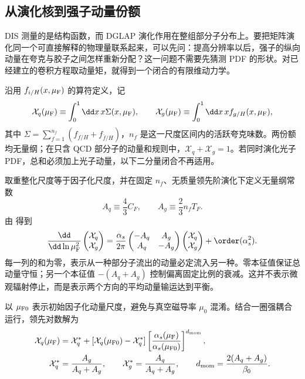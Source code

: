 \subsection{从演化核到强子动量份额}
\label{sec:qcd-momentum-evolution-applications}

DIS 测量的是结构函数，而 DGLAP 演化作用在整组部分子分布上。要把矩阵演化同一个可直接解释的物理量联系起来，可以先问：提高分辨率以后，强子的纵向动量在夸克与胶子之间怎样重新分配？这一问题不需要先猜测 PDF 的形状。对已经建立的卷积方程取动量矩，就得到一个闭合的有限维动力学。

沿用 $f_{i/H}(x,\mu_{\rm F})$ 的算符定义，记
\begin{equation}
 \mathcal X_q(\mu_{\rm F})\equiv\int_0^1\dd x\,x\Sigma(x,\mu_{\rm F}),
 \qquad
 \mathcal X_g(\mu_{\rm F})\equiv\int_0^1\dd x\,x f_{g/H}(x,\mu_{\rm F}),
 \label{eq:qcd-momentum-fractions}
\end{equation}
其中 $\Sigma=\sum_{f=1}^{n_f}(f_{f/H}+f_{\bar f/H})$，$n_f$ 是这一尺度区间内的活跃夸克味数。两份额均无量纲；在只含 QCD 部分子的动量和规则中，$\mathcal X_q+\mathcal X_g=1$。若同时演化光子 PDF，总和必须加上光子动量，以下二分量闭合不再适用。

取重整化尺度等于因子化尺度，并在固定 $n_f$、无质量领先阶演化下定义无量纲常数
\begin{equation*}
 A_q\equiv\frac43C_F,\qquad A_g\equiv\frac23n_fT_F.
\end{equation*}
由 得到
\begin{equation}
 \frac{\dd}{\dd\ln\mu_{\rm F}^2}
 \begin{pmatrix}\mathcal X_q\\\mathcal X_g\end{pmatrix}
 =\frac{\alpha_s}{2\pi}
 \begin{pmatrix}-A_q&A_g\\A_q&-A_g\end{pmatrix}
 \begin{pmatrix}\mathcal X_q\\\mathcal X_g\end{pmatrix}
 +\order(\alpha_s^2).
 \label{eq:qcd-momentum-matrix}
\end{equation}
每一列的和为零，表示从一种部分子流出的动量必定流入另一种。零本征值保证总动量守恒；另一个本征值 $-(A_q+A_g)$ 控制偏离固定比例的衰减。这并不表示微观辐射停止，而是表示两个方向的平均动量输运达到平衡。

以 $\mu_{\rm F0}$ 表示初始因子化动量尺度，避免与真空磁导率 $\mu_0$ 混淆。结合一圈强耦合运行，领先对数解为
\begin{equation}
 \begin{aligned}
 \mathcal X_q(\mu_{\rm F})
 &=\mathcal X_q^*+
 [\mathcal X_q(\mu_{\rm F0})-\mathcal X_q^*]
 \left[\frac{\alpha_s(\mu_{\rm F})}{\alpha_s(\mu_{\rm F0})}\right]^{d_{\rm mom}},\\
 \mathcal X_q^*&=\frac{A_g}{A_q+A_g},\qquad
 \mathcal X_g^*=\frac{A_q}{A_q+A_g},\qquad
 d_{\rm mom}=\frac{2(A_q+A_g)}{\beta_0}.
 \end{aligned}
 \label{eq:qcd-momentum-solution}
\end{equation}

